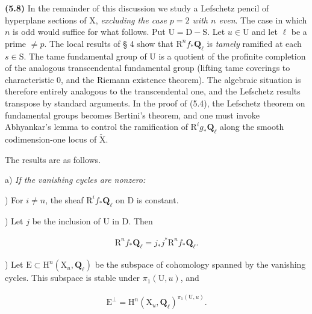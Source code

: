 \documentclass[10pt,leqno]{article}
\begin{document}
\noindent \textbf{(5.8)} In the remainder of this discussion we study a Lefschetz pencil of hyperplane sections of \(\mathrm{X}\), \emph{excluding the case \(p=2\) with \(n\) even}. The case in which \(n\) is odd would suffice for what follows. Put \(\mathrm{U}=\mathrm{D}- \mathrm{S}\). Let \(u\in \mathrm{U}\) and let \(\ell \) be a prime \(\ne p\). The local results of § 4 show that \(\mathrm{R}^{n} f_{*}\mathbf{Q}_{\ell }\) is \emph{tamely} ramified at each \(s\in \mathrm{S}\). The tame fundamental group of \(\mathrm{U}\) is a quotient of the profinite completion of the analogous transcendental fundamental group (lifting tame coverings to characteristic 0, and the Riemann existence theorem). The algebraic situation is therefore entirely analogous to the transcendental one, and the Lefschetz results transpose by standard arguments. In the proof of (5.4), the Lefschetz theorem on fundamental groups becomes Bertini's theorem, and one must invoke Abhyankar's lemma to control the ramification of \(\mathrm{R}^{i} g_{*}\mathbf{Q}_{\ell }\) along the smooth codimension-one locus of \(\check{\mathrm{X}}\).\par

\noindent The results are as follows.\par

\noindent a) \emph{If the vanishing cycles are nonzero:}\par

) For \(i\ne n\), the sheaf \(\mathrm{R}^{i} f_{*}\mathbf{Q}_{\ell }\) on \(\mathrm{D}\) is constant.\par

) Let \(j\) be the inclusion of \(\mathrm{U}\) in \(\mathrm{D}\). Then\par

\begin{equation*}\begin{gathered}\mathrm{R}^{n} f_{*}\mathbf{Q}_{\ell } = j_{*}j^{*}\mathrm{R}^{n} f_{*}\mathbf{Q}_{\ell }.\end{gathered}\end{equation*}

) Let \(\mathrm{E}\subset \mathrm{H}^{n}(\mathrm{X}_{u},\mathbf{Q}_{\ell })\) be the subspace of cohomology spanned by the vanishing cycles. This subspace is stable under \(\pi _{1}(\mathrm{U},u)\), and\par

\begin{equation*}\begin{gathered}\mathrm{E}^{\perp } = \mathrm{H}^{n}(\mathrm{X}_{u},\mathbf{Q}_{\ell })^{\pi _{1}(\mathrm{U},u)}.\end{gathered}\end{equation*}
\end{document}
